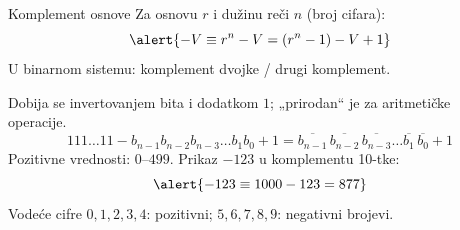 \begin{frame}[label=04-s034]{Komplement osnove}
Za osnovu $r$ i dužinu reči $n$ (broj cifara):
\[\alert{-V\equiv r^n-V=(r^n-1)-V+1}\]
U binarnom sistemu: \alert{komplement dvojke / drugi komplement}.\par
Dobija se invertovanjem bita i dodatkom $1$; „prirodan“ je za aritmetičke operacije.
{\fontsize{10}{12}\selectfont
\[111\ldots11-b_{n-1}b_{n-2}b_{n-3}\ldots b_1b_0+1=\overline{b_{n-1}}\,\overline{b_{n-2}}\,\overline{b_{n-3}}\ldots\overline{b_1}\,\overline{b_0}+1\]}
Pozitivne vrednosti: $0$–$499$. Prikaz $-123$ u komplementu 10-tke:
\[\alert{-123\equiv1000-123=877}\]
Vodeće cifre $0,1,2,3,4$: pozitivni; $5,6,7,8,9$: negativni brojevi.
\end{frame}
